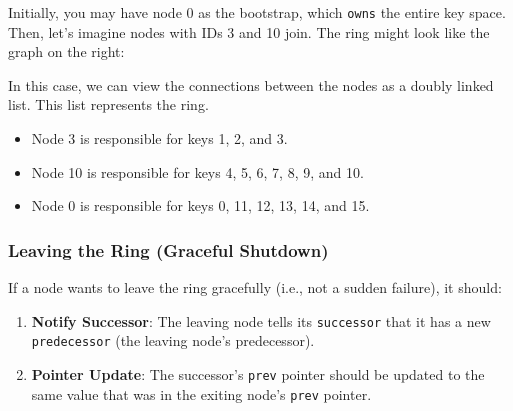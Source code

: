 \begin{minipage}{0.60\textwidth}
Initially, you may have node 0 as the bootstrap, which \texttt{owns} the entire key space.
Then, let's imagine nodes with IDs 3 and 10 join. The ring might look like the graph on the right:

In this case, we can view the connections between the nodes as a doubly linked list. This list represents the ring.

\begin{itemize}[itemsep=1pt, topsep=1pt]
    \item Node 3 is responsible for keys 1, 2, and 3.
    \item Node 10 is responsible for keys 4, 5, 6, 7, 8, 9, and 10.
    \item Node 0 is responsible for keys 0, 11, 12, 13, 14, and 15.
\end{itemize}	
\end{minipage}
\hfill
\begin{minipage}{0.3\textwidth}
\begin{center}
\end{center}
\end{minipage}



\subsubsection{Leaving the Ring (Graceful Shutdown)}

If a node wants to leave the ring gracefully (i.e., not a sudden failure), it should:

\begin{enumerate}[itemsep=1pt, topsep=1pt]
    \item \textbf{Notify Successor}: The leaving node tells its \texttt{successor} that it has a new \texttt{predecessor} (the leaving node's predecessor).
    \item \textbf{Pointer Update}: The successor's \texttt{prev} pointer should be updated to the same value that was in the exiting node's \texttt{prev} pointer.
\end{enumerate}


